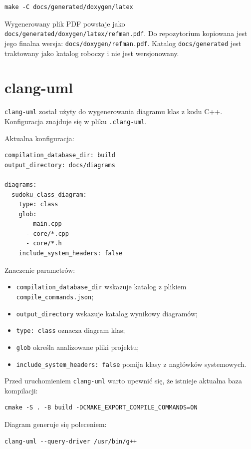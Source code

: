 \documentclass[12pt,a4paper]{article}
\begin{document}
\begin{lstlisting}
make -C docs/generated/doxygen/latex
\end{lstlisting}

Wygenerowany plik PDF powstaje jako
\texttt{docs/generated/doxygen/latex/refman.pdf}. Do repozytorium kopiowana jest
jego finalna wersja: \texttt{docs/doxygen/refman.pdf}. Katalog
\texttt{docs/generated} jest traktowany jako katalog roboczy i nie jest
wersjonowany.

\section{clang-uml}

\texttt{clang-uml} został użyty do wygenerowania diagramu klas z kodu C++.
Konfiguracja znajduje się w pliku \texttt{.clang-uml}.

Aktualna konfiguracja:

\begin{lstlisting}
compilation_database_dir: build
output_directory: docs/diagrams

diagrams:
  sudoku_class_diagram:
    type: class
    glob:
      - main.cpp
      - core/*.cpp
      - core/*.h
    include_system_headers: false
\end{lstlisting}

Znaczenie parametrów:
\begin{itemize}[noitemsep]
    \item \texttt{compilation\_database\_dir} wskazuje katalog z plikiem \texttt{compile\_commands.json};
    \item \texttt{output\_directory} wskazuje katalog wynikowy diagramów;
    \item \texttt{type: class} oznacza diagram klas;
    \item \texttt{glob} określa analizowane pliki projektu;
    \item \texttt{include\_system\_headers: false} pomija klasy z nagłówków systemowych.
\end{itemize}

Przed uruchomieniem \texttt{clang-uml} warto upewnić się, że istnieje aktualna
baza kompilacji:

\begin{lstlisting}
cmake -S . -B build -DCMAKE_EXPORT_COMPILE_COMMANDS=ON
\end{lstlisting}

Diagram generuje się poleceniem:

\begin{lstlisting}
clang-uml --query-driver /usr/bin/g++
\end{lstlisting}
\end{document}

